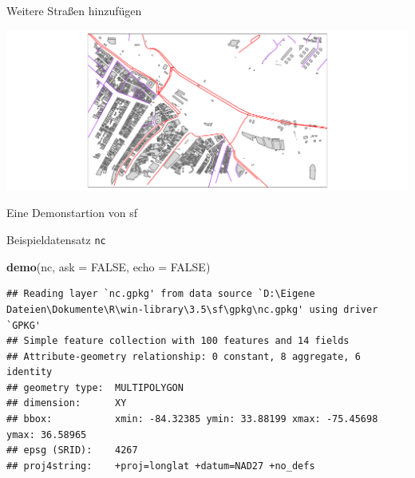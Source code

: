 \documentclass[ignorenonframetext,]{beamer}
\newenvironment{Shaded}{\begin{snugshade}}{\end{snugshade}}
\newcommand{\DataTypeTok}[1]{\textcolor[rgb]{0.13,0.29,0.53}{#1}}
\newcommand{\KeywordTok}[1]{\textcolor[rgb]{0.13,0.29,0.53}{\textbf{#1}}}
\newcommand{\NormalTok}[1]{#1}
\newcommand{\OperatorTok}[1]{\textcolor[rgb]{0.81,0.36,0.00}{\textbf{#1}}}
\newcommand{\OtherTok}[1]{\textcolor[rgb]{0.56,0.35,0.01}{#1}}
\newcommand{\StringTok}[1]{\textcolor[rgb]{0.31,0.60,0.02}{#1}}
\begin{document}
\begin{frame}[fragile]{Weitere Straßen hinzufügen}
\protect\hypertarget{weitere-straen-hinzufugen}{}

\begin{Shaded}
\end{Shaded}

\includegraphics{B7_simplefeatures_files/figure-beamer/unnamed-chunk-36-1.pdf}

\end{frame}

\begin{frame}[fragile]{Eine Demonstartion von sf}
\protect\hypertarget{eine-demonstartion-von-sf}{}

\begin{block}{Beispieldatensatz \texttt{nc}}

\begin{Shaded}
\begin{Highlighting}[]
\KeywordTok{demo}\NormalTok{(nc, }\DataTypeTok{ask =} \OtherTok{FALSE}\NormalTok{, }\DataTypeTok{echo =} \OtherTok{FALSE}\NormalTok{)}
\end{Highlighting}
\end{Shaded}

\begin{verbatim}
## Reading layer `nc.gpkg' from data source `D:\Eigene Dateien\Dokumente\R\win-library\3.5\sf\gpkg\nc.gpkg' using driver `GPKG'
## Simple feature collection with 100 features and 14 fields
## Attribute-geometry relationship: 0 constant, 8 aggregate, 6 identity
## geometry type:  MULTIPOLYGON
## dimension:      XY
## bbox:           xmin: -84.32385 ymin: 33.88199 xmax: -75.45698 ymax: 36.58965
## epsg (SRID):    4267
## proj4string:    +proj=longlat +datum=NAD27 +no_defs
\end{verbatim}

\end{block}

\end{frame}
\end{document}
